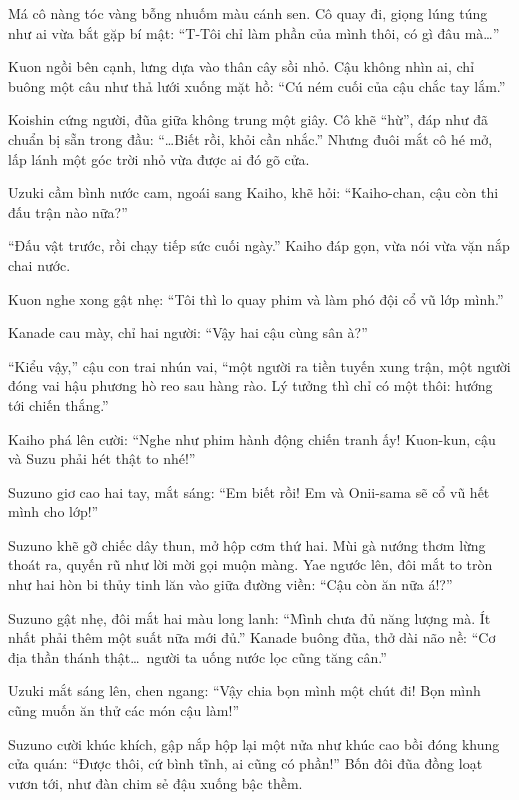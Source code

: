 \documentclass[../main.tex]{subfiles}
\begin{document}
Má cô nàng tóc vàng bỗng nhuốm màu cánh sen. Cô quay đi, giọng lúng túng như ai vừa bắt gặp bí mật: ``T-Tôi chỉ làm phần của mình thôi, có gì đâu mà\dots''

Kuon ngồi bên cạnh, lưng dựa vào thân cây sồi nhỏ. Cậu không nhìn ai, chỉ buông một câu như thả lưới xuống mặt hồ: ``Cú ném cuối của cậu chắc tay lắm.''

Koishin cứng người, đũa giữa không trung một giây. Cô khẽ ``hừ'', đáp như đã chuẩn bị sẵn trong đầu: ``\dots Biết rồi, khỏi cần nhắc.'' Nhưng đuôi mắt cô hé mở, lấp lánh một góc trời nhỏ vừa được ai đó gõ cửa.

\il

Uzuki cầm bình nước cam, ngoái sang Kaiho, khẽ hỏi: ``Kaiho-chan, cậu còn thi đấu trận nào nữa?''

``Đấu vật trước, rồi chạy tiếp sức cuối ngày.'' Kaiho đáp gọn, vừa nói vừa vặn nắp chai nước.

Kuon nghe xong gật nhẹ: ``Tôi thì lo quay phim và làm phó đội cổ vũ lớp mình.''

Kanade cau mày, chỉ hai người: ``Vậy hai cậu cùng sân à?''

``Kiểu vậy,'' cậu con trai nhún vai, ``một người ra tiền tuyến xung trận, một người đóng vai hậu phương hò reo sau hàng rào. Lý tưởng thì chỉ có một thôi: hướng tới chiến thắng.''

Kaiho phá lên cười: ``Nghe như phim hành động chiến tranh ấy! Kuon-kun, cậu và Suzu phải hét thật to nhé!''

Suzuno giơ cao hai tay, mắt sáng: ``Em biết rồi! Em và Onii-sama sẽ cổ vũ hết mình cho lớp!''

\il

Suzuno khẽ gỡ chiếc dây thun, mở hộp cơm thứ hai. Mùi gà nướng thơm lừng thoát ra, quyến rũ như lời mời gọi muộn màng. Yae ngước lên, đôi mắt to tròn như hai hòn bi thủy tinh lăn vào giữa đường viền: ``Cậu còn ăn nữa á!?''

Suzuno gật nhẹ, đôi mắt hai màu long lanh: ``Mình chưa đủ năng lượng mà. Ít nhất phải thêm một suất nữa mới đủ.'' Kanade buông đũa, thở dài não nề: ``Cơ địa thần thánh thật\dots\ người ta uống nước lọc cũng tăng cân.''

Uzuki mắt sáng lên, chen ngang: ``Vậy chia bọn mình một chút đi! Bọn mình cũng muốn ăn thử các món cậu làm!''

Suzuno cười khúc khích, gập nắp hộp lại một nửa như khúc cao bồi đóng khung cửa quán: ``Được thôi, cứ bình tĩnh, ai cũng có phần!'' Bốn đôi đũa đồng loạt vươn tới, như đàn chim sẻ đậu xuống bậc thềm.
\end{document}

